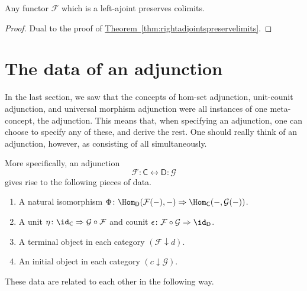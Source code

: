 \documentclass[main.tex]{subfiles}
\begin{document}
\begin{corollary}
  \label{cor:leftadjointspreservecolimits}
  Any functor $\mathcal{F}$ which is a left-ajoint preserves colimits.
\end{corollary}
\begin{proof}
  Dual to the proof of \hyperref[thm:rightadjointspreservelimits]{Theorem~\ref*{thm:rightadjointspreservelimits}}.
\end{proof}

\section{The data of an adjunction}
\label{sec:the_data_of_an_adjunction}

In the last section, we saw that the concepts of hom-set adjunction, unit-counit adjunction, and universal morphism adjunction were all instances of one meta-concept, the adjunction. This means that, when specifying an adjunction, one can choose to specify any of these, and derive the rest. One should really think of an adjunction, however, as consisting of all simultaneously.

More specifically, an adjunction
\begin{equation*}
  \mathcal{F} : \mathsf{C} \leftrightarrow \mathsf{D} : \mathcal{G}
\end{equation*}
gives rise to the following pieces of data.
\begin{enumerate}
  \item A natural isomorphism $\Phi\colon \Hom_{\mathsf{D}}(\mathcal{F}(-), -) \Rightarrow \Hom_{\mathsf{C}}(-, \mathcal{G}(-))$.

  \item A unit $\eta\colon \id_{\mathsf{C}} \Rightarrow \mathcal{G} \circ \mathcal{F}$ and counit $\epsilon\colon \mathcal{F} \circ \mathcal{G} \Rightarrow \id_{\mathsf{D}}$.

  \item A terminal object in each category $(\mathcal{F} \downarrow d)$.

  \item An initial object in each category $(c \downarrow \mathcal{G})$.
\end{enumerate}

These data are related to each other in the following way.
\end{document}
